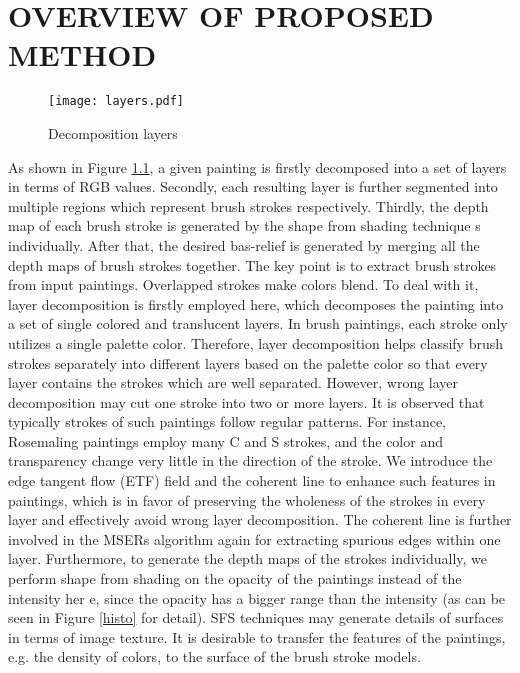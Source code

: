 \chapter{OVERVIEW OF PROPOSED METHOD} 

\begin{figure}
\centering
\texttt{[image: layers.pdf]}
\caption{Decomposition layers }
\label{decom:4layers}
\end{figure}
As shown in Figure \ref{decom:4layers}, a given painting is firstly decomposed into a set of layers in terms of RGB values. Secondly, each resulting layer is further segmented into multiple regions which represent brush strokes respectively. Thirdly, the depth map of each brush stroke is generated by the shape from shading technique	s individually. After that, the desired bas-relief is generated by merging all the depth maps of brush strokes together.
\newline
The key point is to extract brush strokes from input paintings. Overlapped strokes make colors blend. To deal with it, layer decomposition is firstly employed here, which decomposes the painting into a set of single colored and translucent layers. In brush paintings, each stroke only utilizes a single palette color. Therefore, layer decomposition helps classify brush strokes separately into different layers based on the palette color so that every layer contains the strokes which are well separated.
However, wrong layer decomposition may cut one stroke into two or more layers. It is observed that typically strokes of such paintings follow regular patterns. For instance, Rosemaling paintings employ many C and S strokes, and the color and transparency change very little in the direction of the stroke. We introduce the edge tangent flow (ETF) field and the coherent line \cite{kang2007coherent} to enhance such features in paintings, which is in favor of preserving the wholeness of the strokes in every layer and effectively avoid wrong layer decomposition.
\newline
The coherent line is further involved in the MSERs algorithm \cite{donoser2006efficient} again for extracting spurious edges within one layer.
Furthermore, to generate the depth maps of the strokes individually, we perform shape from shading on the opacity of the paintings instead of the intensity her	e, since the opacity has a bigger range than the intensity (as can be seen in Figure \ref{histo} for detail). SFS techniques may generate details of surfaces in terms of image texture. It is desirable to transfer the features of the paintings, e.g. the density of colors, to the surface of the brush stroke models.

